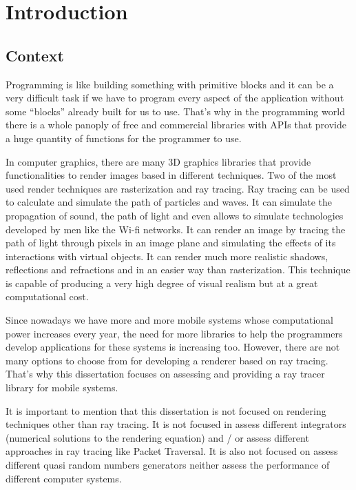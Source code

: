 \chapter{Introduction}

\section{Context}

\par
Programming is like building something with primitive blocks and it can be a very difficult task if we have to program every aspect of the application without some “blocks” already built for us to use.
That’s why in the programming world there is a whole panoply of free and commercial libraries with APIs that provide a huge quantity of functions for the programmer to use.

\par
In computer graphics, there are many 3D graphics libraries that provide functionalities to render images based in different techniques.
Two of the most used render techniques are rasterization and ray tracing.
Ray tracing can be used to calculate and simulate the path of particles and waves.
It can simulate the propagation of sound, the path of light and even allows to simulate technologies developed by men like the Wi-fi networks.
It can render an image by tracing the path of light through pixels in an image plane and simulating the effects of its interactions with virtual objects.
It can render much more realistic shadows, reflections and refractions and in an easier way than rasterization.
This technique is capable of producing a very high degree of visual realism but at a great computational cost.

\par
Since nowadays we have more and more mobile systems whose computational power increases every year, the need for more libraries to help the programmers develop applications for these systems is increasing too.
However, there are not many options to choose from for developing a renderer based on ray tracing.
That’s why this dissertation focuses on assessing and providing a ray tracer library for mobile systems.

\par
It is important to mention that this dissertation is not focused on rendering techniques other than ray tracing.
It is not focused in assess different integrators (numerical solutions to the rendering equation) and / or assess different approaches in ray tracing like Packet Traversal.
It is also not focused on assess different quasi random numbers generators neither assess the performance of different computer systems.

